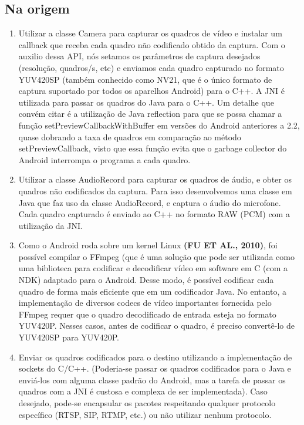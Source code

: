 \documentclass{acm_proc_article-sp}
\newcommand{\todo}[1]{\textcolor[rgb]{1.00,0.00,0.00}{\bf \uppercase{#1}}}
\begin{document}
\subsection{Na origem}
\begin{enumerate}
 \item Utilizar a classe Camera para capturar os quadros de vídeo e instalar um callback que receba cada quadro não codificado obtido da captura. Com o auxilio dessa API, nós setamos os parâmetros de captura desejados (resolução, quadros/s, etc) e enviamos cada quadro capturado no formato YUV420SP (também conhecido como NV21, que é o único formato de captura suportado por todos os aparelhos Android) para o C++. A JNI é utilizada para passar os quadros do Java para o C++.
Um detalhe que convém citar é a utilização de Java reflection para que se possa chamar a função setPreviewCallbackWithBuffer em versões do Android anteriores a 2.2, quase dobrando a taxa de quadros em comparação ao método setPreviewCallback, visto que essa função evita que o garbage collector do Android interrompa o programa a cada quadro.
 \item Utilizar a classe AudioRecord para capturar os quadros de áudio, e obter os quadros não codificados da captura. Para isso desenvolvemos uma classe em Java que faz uso da classe AudioRecord, e captura o áudio do microfone. Cada quadro capturado é enviado ao C++ no formato RAW (PCM) com a utilização da JNI.
 \item Como o Android roda sobre um kernel Linux \todo{(FU et al., 2010)}, foi possível compilar o FFmpeg (que é uma solução que pode ser utilizada como uma biblioteca para codificar e decodificar vídeo em software \cite{ffmpeg} em C (com a NDK) adaptado para o Android. Desse modo, é possível codificar cada quadro de forma mais eficiente que em um codificador Java. No entanto, a implementação de diversos codecs de vídeo importantes fornecida pelo FFmpeg requer que o quadro decodificado de entrada esteja no formato YUV420P. Nesses casos, antes de codificar o quadro, é preciso convertê-lo de YUV420SP para YUV420P.
 \item Enviar os quadros codificados para o destino utilizando a implementação de sockets do C/C++. (Poderia-se passar os quadros codificados para o Java e enviá-los com alguma classe padrão do Android, mas a tarefa de passar os quadros com a JNI é custosa e complexa de ser implementada). Caso desejado, pode-se encapsular os pacotes respeitando qualquer protocolo específico (RTSP, SIP, RTMP, etc.) ou não utilizar nenhum protocolo.
\end{enumerate}
\end{document}
